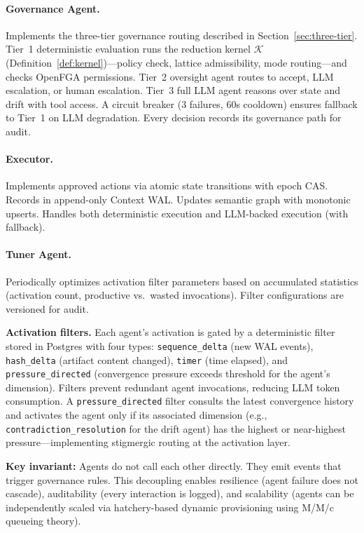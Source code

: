 \documentclass[11pt]{article}
\begin{document}
\paragraph{Governance Agent.}
Implements the three-tier governance routing described in Section~\ref{sec:three-tier}. Tier~1 deterministic evaluation runs the reduction kernel $\mathcal{K}$ (Definition~\ref{def:kernel})---policy check, lattice admissibility, mode routing---and checks OpenFGA permissions. Tier~2 oversight agent routes to accept, LLM escalation, or human escalation. Tier~3 full LLM agent reasons over state and drift with tool access. A circuit breaker (3 failures, 60s cooldown) ensures fallback to Tier~1 on LLM degradation. Every decision records its governance path for audit.

\paragraph{Executor.}
Implements approved actions via atomic state transitions with epoch CAS. Records in append-only Context WAL. Updates semantic graph with monotonic upserts. Handles both deterministic execution and LLM-backed execution (with fallback).

\paragraph{Tuner Agent.}
Periodically optimizes activation filter parameters based on accumulated statistics (activation count, productive vs.\ wasted invocations). Filter configurations are versioned for audit.

\medskip
\textbf{Activation filters.} Each agent's activation is gated by a deterministic filter stored in Postgres with four types: \texttt{sequence\_delta} (new WAL events), \texttt{hash\_delta} (artifact content changed), \texttt{timer} (time elapsed), and \texttt{pressure\_directed} (convergence pressure exceeds threshold for the agent's dimension). Filters prevent redundant agent invocations, reducing LLM token consumption. A \texttt{pressure\_directed} filter consults the latest convergence history and activates the agent only if its associated dimension (e.g., \texttt{contradiction\_resolution} for the drift agent) has the highest or near-highest pressure---implementing stigmergic routing at the activation layer.

\medskip
\textbf{Key invariant:} Agents do not call each other directly. They emit events that trigger governance rules. This decoupling enables resilience (agent failure does not cascade), auditability (every interaction is logged), and scalability (agents can be independently scaled via hatchery-based dynamic provisioning using M/M/c queueing theory).
\end{document}

